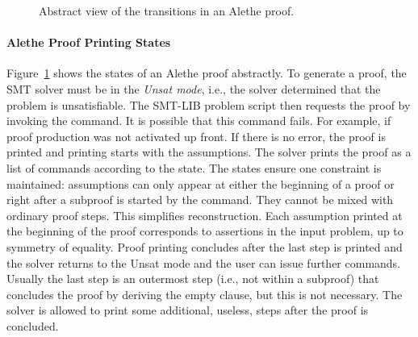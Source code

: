 \documentclass{scrartcl}
\newcommand\smtlib{SMT-LIB}
\theoremstyle{definition}
\begin{document}

  \begin{figure}[t]
\center
{}
\label{fig:proof-states}\caption{Abstract view of the transitions in an Alethe proof.}
\end{figure}


\paragraph{Alethe Proof Printing States}
Figure~\ref{fig:proof-states} shows the states of an Alethe proof
abstractly.  To generate a proof, the SMT solver must be in the
{\em Unsat mode}, i.e., the solver determined that the problem
is unsatisfiable.  The {\smtlib} problem script then requests the proof by
invoking the  command.  It is possible that this command
fails. For example, if proof production was not activated up front.
If there is no error, the proof is printed and printing starts with
the assumptions.  The solver prints the proof as a list of commands
according to the state.  The states ensure one constraint is maintained:
assumptions can only appear at either the beginning of a proof or right
after a subproof is started by the  command.  They cannot
be mixed with ordinary proof steps.  This simplifies
reconstruction.  Each assumption printed at the beginning of the proof
corresponds to assertions in the input problem, up to symmetry of equality.
Proof printing concludes after the last step is printed and the solver
returns to the Unsat mode and the user can issue further commands.
Usually the last step is an outermost step
(i.e., not within a subproof) that concludes the proof by deriving
the empty clause, but this is not necessary.
The solver is allowed to print some additional, useless,
steps after the proof is concluded.
\end{document}
